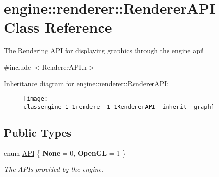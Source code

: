 \hypertarget{classengine_1_1renderer_1_1RendererAPI}{}\section{engine\+:\+:renderer\+:\+:Renderer\+A\+PI Class Reference}
\label{classengine_1_1renderer_1_1RendererAPI}


The Rendering A\+PI for displaying graphics through the engine api!  




{\ttfamily \#include $<$Renderer\+A\+P\+I.\+h$>$}



Inheritance diagram for engine\+:\+:renderer\+:\+:Renderer\+A\+PI\+:
\nopagebreak
\begin{figure}[H]
\begin{center}
\leavevmode
\texttt{[image: classengine\_1\_1renderer\_1\_1RendererAPI\_\_inherit\_\_graph]}
\end{center}
\end{figure}
\subsection*{Public Types}
\begin{DoxyCompactItemize}
\item 
\mbox{\label{classengine_1_1renderer_1_1RendererAPI_a624c2793dc8b315466c36332bbc82ef0}} 
enum \hyperlink{classengine_1_1renderer_1_1RendererAPI_a624c2793dc8b315466c36332bbc82ef0}{A\+PI} \{ {\bfseries None} = 0, 
{\bfseries Open\+GL} = 1
 \}\begin{DoxyCompactList}\small\item\em The A\+P\+Is provided by the engine. \end{DoxyCompactList}
\end{DoxyCompactItemize}
